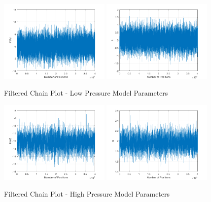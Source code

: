 \documentclass{article}
\begin{document}
\begin{figure}[htb!]
\centering
\includegraphics[width=0.48\textwidth]{FilteredChain_lnA_LP.png}
\includegraphics[width=0.48\textwidth]{FilteredChain_n_LP.png}
\caption{Filtered Chain Plot - Low Pressure Model Parameters}
\label{LPChain}
\end{figure}

\begin{figure}[htb!]
\centering
\includegraphics[width=0.48\textwidth]{FilteredChain_lnA_HP.png}
\includegraphics[width=0.48\textwidth]{FilteredChain_n_HP.png}
\caption{Filtered Chain Plot - High Pressure Model Parameters}
\label{HPChain}
\end{figure}
\end{document}
